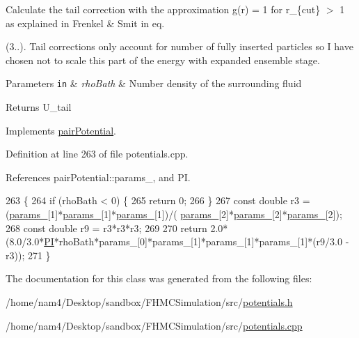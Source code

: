 Calculate the tail correction with the approximation g(r) = 1 for r\-\_\-\{cut\} $>$ 1 as explained in Frenkel \& Smit in eq. 

(3..). Tail corrections only account for number of fully inserted particles so I have chosen not to scale this part of the energy with expanded ensemble stage.


\begin{DoxyParams}[1]{Parameters}
\mbox{\tt in}  & {\em rho\-Bath} & Number density of the surrounding fluid\\
\hline
\end{DoxyParams}
\begin{DoxyReturn}{Returns}
U\-\_\-tail 
\end{DoxyReturn}


Implements \hyperlink{classpair_potential_a5387d21d8d487d1d42e9eaf7cae9175b}{pair\-Potential}.



Definition at line 263 of file potentials.\-cpp.



References pair\-Potential\-::params\-\_\-, and P\-I.


\begin{DoxyCode}
263                                                         \{
264     \textcolor{keywordflow}{if} (rhoBath < 0) \{
265         \textcolor{keywordflow}{return} 0;
266     \}
267     \textcolor{keyword}{const} \textcolor{keywordtype}{double} r3 = (\hyperlink{classpair_potential_abf8ec8af983d6e9960bd149da099e883}{params\_}[1]*\hyperlink{classpair_potential_abf8ec8af983d6e9960bd149da099e883}{params\_}[1]*\hyperlink{classpair_potential_abf8ec8af983d6e9960bd149da099e883}{params\_}[1])/(
      \hyperlink{classpair_potential_abf8ec8af983d6e9960bd149da099e883}{params\_}[2]*\hyperlink{classpair_potential_abf8ec8af983d6e9960bd149da099e883}{params\_}[2]*\hyperlink{classpair_potential_abf8ec8af983d6e9960bd149da099e883}{params\_}[2]);
268     \textcolor{keyword}{const} \textcolor{keywordtype}{double} r9 = r3*r3*r3;
269 
270     \textcolor{keywordflow}{return} 2.0*(8.0/3.0*\hyperlink{global_8h_a598a3330b3c21701223ee0ca14316eca}{PI}*rhoBath*params\_[0]*params\_[1]*params\_[1]*params\_[1]*(r9/3.0 - r3));
271 \}
\end{DoxyCode}


The documentation for this class was generated from the following files\-:\begin{DoxyCompactItemize}
\item 
/home/nam4/\-Desktop/sandbox/\-F\-H\-M\-C\-Simulation/src/\hyperlink{potentials_8h}{potentials.\-h}\item 
/home/nam4/\-Desktop/sandbox/\-F\-H\-M\-C\-Simulation/src/\hyperlink{potentials_8cpp}{potentials.\-cpp}\end{DoxyCompactItemize}
